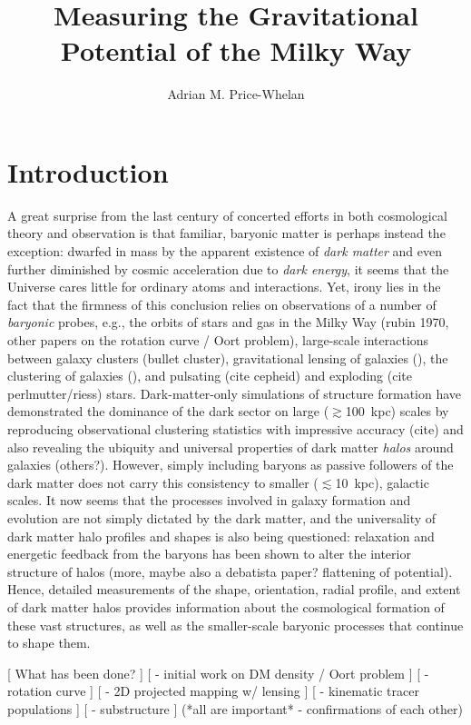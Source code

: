 \documentclass[letterpaper,12pt,preprint]{aastex}
\begin{document}
\title{Measuring the Gravitational Potential of the Milky Way}
\author{Adrian M. Price-Whelan}

\section{Introduction}

A great surprise from the last century of concerted efforts in both cosmological theory and observation is that familiar, baryonic matter is perhaps instead the exception: dwarfed in mass by the apparent existence of \emph{dark matter} and even further diminished by cosmic acceleration due to \emph{dark energy}, it seems that the Universe cares little for ordinary atoms and interactions. Yet, irony lies in the fact that the firmness of this conclusion relies on observations of a number of \emph{baryonic} probes, e.g., the orbits of stars and gas in the Milky Way (rubin 1970, other papers on the rotation curve / Oort problem), large-scale interactions between galaxy clusters (bullet cluster), gravitational lensing of galaxies (), the clustering of galaxies (), and pulsating (cite cepheid) and exploding (cite perlmutter/riess) stars. Dark-matter-only simulations of structure formation have demonstrated the dominance of the dark sector on large ($\gtrsim$100~kpc) scales by reproducing observational clustering statistics with impressive accuracy (cite) and also revealing the ubiquity and universal properties of dark matter \emph{halos} around galaxies \citep{navarro96} (others?). However, simply including baryons as passive followers of the dark matter does not carry this consistency to smaller ($\lesssim$10~kpc), galactic scales. It now seems that the processes involved in galaxy formation and evolution are not simply dictated by the dark matter, and the universality of dark matter halo profiles and shapes is also being questioned: relaxation and energetic feedback from the baryons has been shown to alter the interior structure of halos \citep[e.g.][]{bailin05, pontzen12} (more, maybe also a debatista paper? flattening of potential). Hence, detailed measurements of the shape, orientation, radial profile, and extent of dark matter halos provides information about the cosmological formation of these vast structures, as well as the smaller-scale baryonic processes that continue to shape them.

[ What has been done? ]
[ - initial work on DM density / Oort problem ]
[ - rotation curve ]
[ - 2D projected mapping w/ lensing ]
[ - kinematic tracer populations ]
[ - substructure ]
(*all are important* - confirmations of each other)
\end{document}
